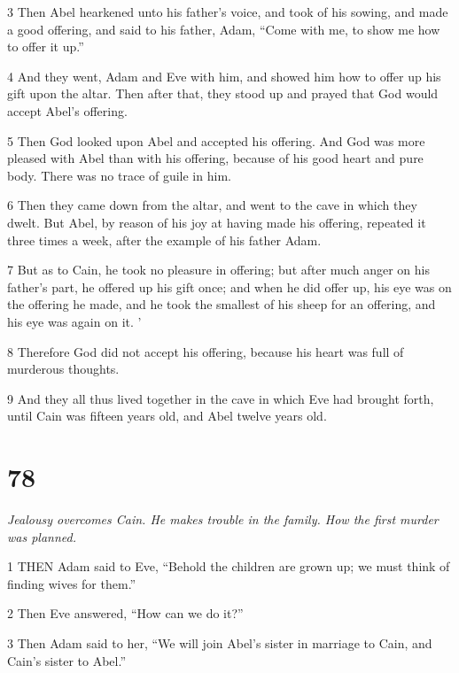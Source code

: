 \par 3 Then Abel hearkened unto his father's voice, and took of his sowing, and made a good offering, and said to his father, Adam, “Come with me, to show me how to offer it up.”

\par 4 And they went, Adam and Eve with him, and showed him how to offer up his gift upon the altar. Then after that, they stood up and prayed that God would accept Abel's offering.

\par 5 Then God looked upon Abel and accepted his offering. And God was more pleased with Abel than with his offering, because of his good heart and pure body. There was no trace of guile in him.

\par 6 Then they came down from the altar, and went to the cave in which they dwelt. But Abel, by reason of his joy at having made his offering, repeated it three times a week, after the example of his father Adam.

\par 7 But as to Cain, he took no pleasure in offering; but after much anger on his father's part, he offered up his gift once; and when he did offer up, his eye was on the offering he made, and he took the smallest of his sheep for an offering, and his eye was again on it. '

\par 8 Therefore God did not accept his offering, because his heart was full of murderous thoughts.

\par 9 And they all thus lived together in the cave in which Eve had brought forth, until Cain was fifteen years old, and Abel twelve years old.

\chapter{78}

\par \textit{Jealousy overcomes Cain. He makes trouble in the family. How the first murder was planned.}

\par 1 THEN Adam said to Eve, “Behold the children are grown up; we must think of finding wives for them.”

\par 2 Then Eve answered, “How can we do it?”

\par 3 Then Adam said to her, “We will join Abel's sister in marriage to Cain, and Cain's sister to Abel.”

